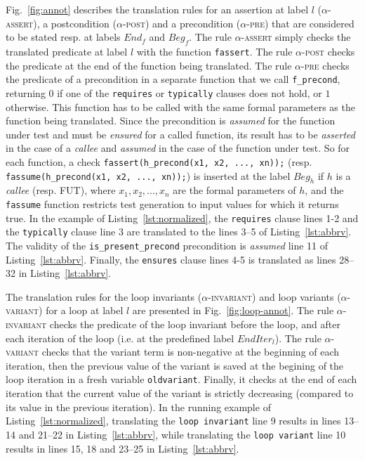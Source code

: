 Fig.~\ref{fig:annot} describes the translation rules for an assertion at label $l$
(\textsc{$\alpha$-assert}), a postcondition (\textsc{$\alpha$-post}) and
a precondition (\textsc{$\alpha$-pre})
that are considered to be stated resp. at labels $End_f$ and $Beg_f$. 
The rule \textsc{$\alpha$-assert}
simply checks the translated predicate at label $l$ with the function
\lstinline|fassert|. The rule \textsc{$\alpha$-post} checks the predicate at
the end of the function being translated. The rule \textsc{$\alpha$-pre} checks
the predicate of a precondition in a separate function that we call
\lstinline'f_precond', returning $0$ if one of the \lstinline|requires| or
\lstinline|typically| clauses does not hold, or $1$ otherwise. This function
has to be called with the same formal parameters as the function
being translated.
Since the precondition is \emph{assumed} for the function under test
and must be \emph{ensured} for a called function,
its result has to be {\em asserted} in the case
of a {\em callee}  and {\em assumed} in the case of the function under
test.
So for each function, a check 
\lstinline|fassert(h_precond(x1, x2, ..., xn));| (resp.
\lstinline|fassume(h_precond(x1, x2, ..., xn));|) is inserted at the label
$Beg_h$ if $h$ is a {\em callee} (resp. FUT), where
$x_1, x_2, ..., x_n$ are the formal parameters of $h$, and
the \lstinline|fassume| function restricts 
test generation to input values for which it returns true.
In the example of Listing~\ref{lst:normalized}, the
\lstinline|requires| clause lines 1-2 and the \lstinline|typically| clause line
3 are translated to the lines 3--5 of Listing~\ref{lst:abbrv}. The validity of the
\lstinline'is_present_precond' precondition is {\em assumed} line 11 of
Listing~\ref{lst:abbrv}. Finally, the \lstinline|ensures| clause lines 4-5 is
translated as lines 28--32 in Listing~\ref{lst:abbrv}. 

The translation rules for the loop invariants (\textsc{$\alpha$-invariant}) and
loop variants (\textsc{$\alpha$-variant}) for a loop at label $l$ are presented in
Fig.~\ref{fig:loop-annot}. The rule \textsc{$\alpha$-invariant} checks the
predicate of the loop invariant before the loop, and after
each iteration of the loop (i.e. at the predefined label $EndIter_l$). The rule
\textsc{$\alpha$-variant} checks that the variant term is non-negative at the
beginning of each iteration,
then the previous value of the variant is saved at the begining of the loop
iteration in a fresh variable 
\lstinline|oldvariant|. Finally, it checks at the end of each iteration that
the current value of the variant is strictly
decreasing (compared to its value in the previous iteration).
In the running example of Listing~\ref{lst:normalized}, translating the
\lstinline|loop invariant| line 9 results in lines 13--14 and 21--22 in
Listing~\ref{lst:abbrv}, while translating the \lstinline|loop variant| line 10
results in lines 15, 18 and 23--25 in Listing~\ref{lst:abbrv}.


